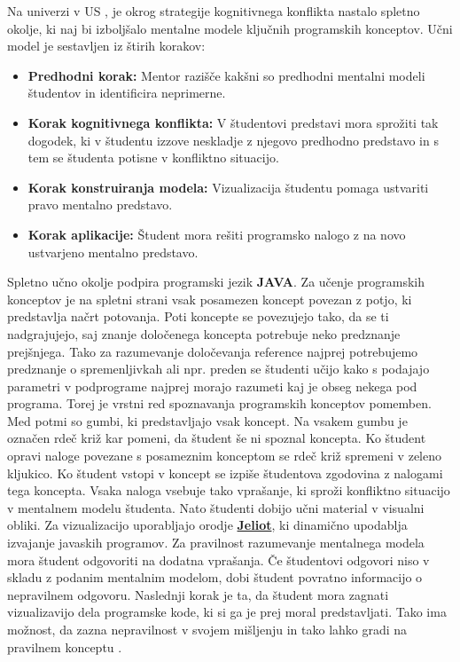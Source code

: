 
Na univerzi v US \cite{mentalModels}, je okrog strategije kognitivnega
konflikta nastalo spletno okolje, ki naj bi izboljšalo mentalne modele
ključnih programskih konceptov. Učni model je sestavljen iz štirih
korakov:

\begin{itemize}
\item \textbf{Predhodni korak:} Mentor razišče kakšni so predhodni
 mentalni modeli študentov in identificira neprimerne.
\item \textbf{Korak kognitivnega konflikta:} V študentovi predstavi
  mora sprožiti tak dogodek, ki v študentu izzove neskladje z njegovo
  predhodno predstavo in s tem se študenta potisne v konfliktno
  situacijo.
\item \textbf{Korak konstruiranja modela:} Vizualizacija študentu
  pomaga ustvariti pravo mentalno predstavo.
\item \textbf{Korak aplikacije:} Študent mora rešiti programsko
  nalogo z na novo ustvarjeno mentalno predstavo.
\end{itemize}

Spletno učno okolje podpira programski jezik \textbf{JAVA}. Za učenje
programskih konceptov je na spletni strani vsak posamezen koncept
povezan z potjo, ki predstavlja načrt potovanja. Poti koncepte se
povezujejo tako, da se ti nadgrajujejo, saj znanje določenega koncepta
potrebuje neko predznanje prejšnjega. Tako za razumevanje določevanja
reference najprej potrebujemo predznanje o spremenljivkah ali
npr. preden se študenti učijo kako s podajajo parametri v podprograme
najprej morajo razumeti kaj je obseg nekega pod programa. Torej je
vrstni red spoznavanja programskih konceptov pomemben. Med potmi so
gumbi, ki predstavljajo vsak koncept. Na vsakem gumbu je označen rdeč
križ kar pomeni, da študent še ni spoznal koncepta. Ko študent opravi
naloge povezane s posameznim konceptom se rdeč križ spremeni v zeleno
kljukico. Ko študent vstopi v koncept se izpiše študentova zgodovina z
nalogami tega koncepta. Vsaka naloga vsebuje tako vprašanje, ki sproži
konfliktno situacijo v mentalnem modelu študenta. Nato študenti dobijo
učni material v visualni obliki. Za vizualizacijo uporabljajo orodje
\href{https://cs.joensuu.fi/jeliot/}{\textbf{Jeliot}}, ki dinamično
upodablja izvajanje javaskih programov. Za pravilnost razumevanje
mentalnega modela mora študent odgovoriti na dodatna vprašanja. Če
študentovi odgovori niso v skladu z podanim mentalnim modelom, dobi
študent povratno informacijo o nepravilnem odgovoru. Naslednji korak
je ta, da študent mora zagnati vizualizavijo dela programske kode, ki
si ga je prej moral predstavljati. Tako ima možnost, da zazna
nepravilnost v svojem mišljenju in tako lahko gradi na pravilnem
konceptu \cite{mentalModels}.

